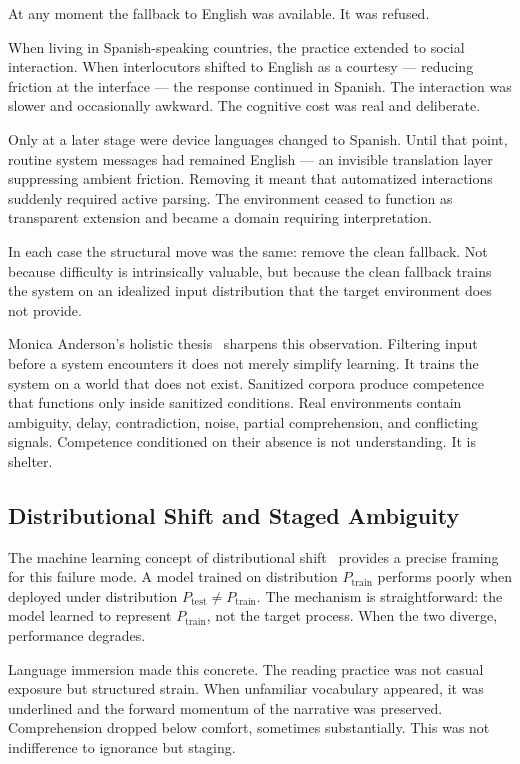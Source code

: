 \documentclass[11pt]{article}
\theoremstyle{remark}
\begin{document}
At any moment the fallback to English was available. It was refused.

When living in Spanish-speaking countries, the practice extended to social interaction. When interlocutors shifted to English as a courtesy --- reducing friction at the interface --- the response continued in Spanish. The interaction was slower and occasionally awkward. The cognitive cost was real and deliberate.

Only at a later stage were device languages changed to Spanish. Until that point, routine system messages had remained English --- an invisible translation layer suppressing ambient friction. Removing it meant that automatized interactions suddenly required active parsing. The environment ceased to function as transparent extension and became a domain requiring interpretation.

In each case the structural move was the same: remove the clean fallback. Not because difficulty is intrinsically valuable, but because the clean fallback trains the system on an idealized input distribution that the target environment does not provide.

Monica Anderson's holistic thesis~\cite{anderson} sharpens this observation. Filtering input before a system encounters it does not merely simplify learning. It trains the system on a world that does not exist. Sanitized corpora produce competence that functions only inside sanitized conditions. Real environments contain ambiguity, delay, contradiction, noise, partial comprehension, and conflicting signals. Competence conditioned on their absence is not understanding. It is shelter.

\subsection{Distributional Shift and Staged Ambiguity}

The machine learning concept of distributional shift~\cite{quinonero} provides a precise framing for this failure mode. A model trained on distribution $P_{\text{train}}$ performs poorly when deployed under distribution $P_{\text{test}} \neq P_{\text{train}}$. The mechanism is straightforward: the model learned to represent $P_{\text{train}}$, not the target process. When the two diverge, performance degrades.

Language immersion made this concrete. The reading practice was not casual exposure but structured strain. When unfamiliar vocabulary appeared, it was underlined and the forward momentum of the narrative was preserved. Comprehension dropped below comfort, sometimes substantially. This was not indifference to ignorance but staging.
\end{document}
